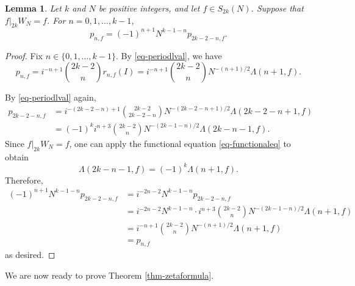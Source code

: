 \documentclass[12pt]{amsart}
\numberwithin{equation}{section}
\newtheorem{lemma}[theorem]{Lemma}
\theoremstyle{definition}
\begin{document}
\begin{lemma}\label{lem-coeffrel}
    Let $k$ and $N$ be positive integers, and let $f\in S_{2k}(N)$. Suppose that $f|_{2k}W_{N}=f$. For $n=0,1,\ldots,k-1$,
    $$p_{n,f}=(-1)^{n+1}N^{k-1-n}p_{2k-2-n,f}.$$
\end{lemma}

\begin{proof}
    Fix $n\in\{0,1,\ldots,k-1\}$. By \eqref{eq-periodlval}, we have
    \begin{equation*}
        p_{n,f}=i^{-n+1}\binom{2k-2}{n}r_{n,f}(I)=i^{-n+1}\binom{2k-2}{n}N^{-(n+1)/2}\Lambda(n+1,f).
    \end{equation*}

    By \eqref{eq-periodlval} again,
    \begin{align*}
        p_{2k-2-n,f}&=i^{-(2k-2-n)+1}\binom{2k-2}{2k-2-n}N^{-(2k-2-n+1)/2}\Lambda(2k-2-n+1,f)\\
        &=(-1)^{k}i^{n+3}\binom{2k-2}{n}N^{-(2k-1-n)/2}\Lambda(2k-n-1,f).
    \end{align*}
    Since $f|_{2k}W_{N}=f$, one can apply the functional equation \eqref{eq-functionaleq} to obtain
    $$\Lambda(2k-n-1,f)=(-1)^{k}\Lambda(n+1,f).$$
    Therefore,
    \begin{align*}
        (-1)^{n+1}N^{k-1-n}p_{2k-2-n,f}&=i^{-2n-2}N^{k-1-n}p_{2k-2-n,f}\\
        &=i^{-2n-2}N^{k-1-n}\cdot i^{n+3}\binom{2k-2}{n}N^{-(2k-1-n)/2}\Lambda(n+1,f)\\
        &=i^{-n+1}\binom{2k-2}{n}N^{-(n+1)/2}\Lambda(n+1,f)\\
        &=p_{n,f}
    \end{align*}
    as desired.
\end{proof}

We are now ready to prove Theorem \ref{thm-zetaformula}.
\end{document}
